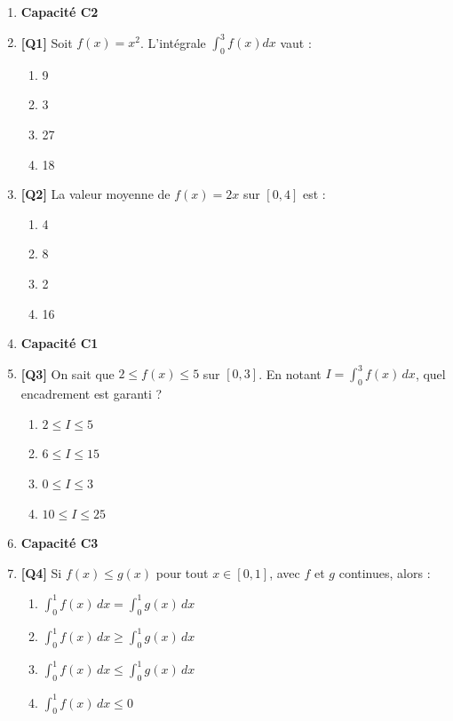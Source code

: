 \begin{enumerate}

\item[] \textbf{Capacité C2}

\item \textbf{[Q1]} Soit $f(x) = x^2$. L'intégrale $\int_{0}^{3} f(x) dx$ vaut :
  \begin{enumerate}[label=\Alph*.]
    \item 9
    \item 3
    \item 27
    \item 18
  \end{enumerate}

\item \textbf{[Q2]} La valeur moyenne de $f(x) = 2x$ sur $[0, 4]$ est :
  \begin{enumerate}[label=\Alph*.]
    \item 4
    \item 8
    \item 2
    \item 16
  \end{enumerate}

\item[] \textbf{Capacité C1}

\item \textbf{[Q3]} On sait que $2 \leqslant f(x) \leqslant 5$ sur $[0,3]$. En notant $I=\int_0^3 f(x)\,dx$, quel encadrement est garanti ?
  \begin{enumerate}[label=\Alph*.]
    \item $2 \leqslant I \leqslant 5$
    \item $6 \leqslant I \leqslant 15$
    \item $0 \leqslant I \leqslant 3$
    \item $10 \leqslant I \leqslant 25$
  \end{enumerate}

\item[] \textbf{Capacité C3}

\item \textbf{[Q4]} Si $f(x) \leqslant g(x)$ pour tout $x\in[0,1]$, avec $f$ et $g$ continues, alors :
  \begin{enumerate}[label=\Alph*.]
    \item $\int_0^1 f(x)\,dx = \int_0^1 g(x)\,dx$
    \item $\int_0^1 f(x)\,dx \geqslant \int_0^1 g(x)\,dx$
    \item $\int_0^1 f(x)\,dx \leqslant \int_0^1 g(x)\,dx$
    \item $\int_0^1 f(x)\,dx \leqslant 0$
  \end{enumerate}


\end{enumerate}
